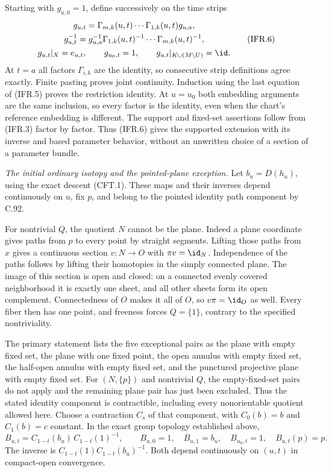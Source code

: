 Starting with $g_{u,0}=1$, define successively on the time strips
\[
\begin{gathered}
 g_{u,t}=\Gamma_{m,k}(u,t)\cdots\Gamma_{1,k}(u,t)g_{u,a},\\
 g_{u,t}^{-1}=g_{u,a}^{-1}
                   \Gamma_{1,k}(u,t)^{-1}\cdots\Gamma_{m,k}(u,t)^{-1},\\
 g_{u,t}|_X=e_{u,t},\qquad g_{u_0,t}=1,\qquad
 g_{u,t}|_{K\cup(M\setminus U)}=\id.
\end{gathered}                                                    \tag{IFR.6}
\]
At $t=a$ all factors $\Gamma_{i,k}$ are the identity, so consecutive
strip definitions agree exactly. Finite pasting proves joint continuity.
Induction using the last equation of (IFR.5) proves the restriction
identity. At $u=u_0$ both embedding arguments are the same inclusion,
so every factor is the identity, even when the chart's reference
embedding is different. The support and fixed-set assertions follow
from (IFR.3) factor by factor. Thus (IFR.6) gives the supported
extension with its inverse and based parameter behavior, without an
unwritten choice of a section of a parameter bundle.

\emph{The initial ordinary isotopy and the pointed-plane exception.}
Let $b_u=D(h_u)$, using the exact descent (CFT.1). These maps and
their inverses depend continuously on $u$, fix $p$, and belong to
the pointed identity path component by C.92.

For nontrivial $Q$, the quotient $N$ cannot be the plane. Indeed a
plane coordinate gives paths from $p$ to every point by straight
segments. Lifting those paths from $x$ gives a continuous section
$v:N\to O$ with $\pi v=\id_N$. Independence of the paths follows
by lifting their homotopies in the simply connected plane.
The image of this section is open and closed: on a connected evenly
covered neighborhood it is exactly one sheet, and all other sheets
form its open complement. Connectedness of $O$ makes it all of $O$,
so $v\pi=\id_O$ as well. Every fiber then has one point, and freeness
forces $Q=\{1\}$, contrary to the specified nontriviality.

The primary statement
\cite[Theorem~1.1, p.~1]{C_Yagasaki2000} lists the five exceptional
pairs as the plane with empty fixed set, the plane with one fixed
point, the open annulus with empty fixed set, the half-open annulus
with empty fixed set, and the punctured projective plane with empty
fixed set. For $(N,\{p\})$ and nontrivial $Q$, the empty-fixed-set
pairs do not apply and the remaining plane pair has just been excluded.
Thus the stated identity component is contractible, including every
nonorientable quotient allowed here.
Choose a contraction $C_s$ of that component, with $C_0(b)=b$ and
$C_1(b)=c$ constant. In the exact group topology established above,
\[
 B_{u,t}=C_{1-t}(b_u)\,C_{1-t}(1)^{-1},\qquad
 B_{u,0}=1,\quad B_{u,1}=b_u,\quad B_{u_0,t}=1,
                  \quad B_{u,t}(p)=p.                          \tag{IFR.7}
\]
The inverse is $C_{1-t}(1)C_{1-t}(b_u)^{-1}$. Both depend
continuously on $(u,t)$ in compact-open convergence.

